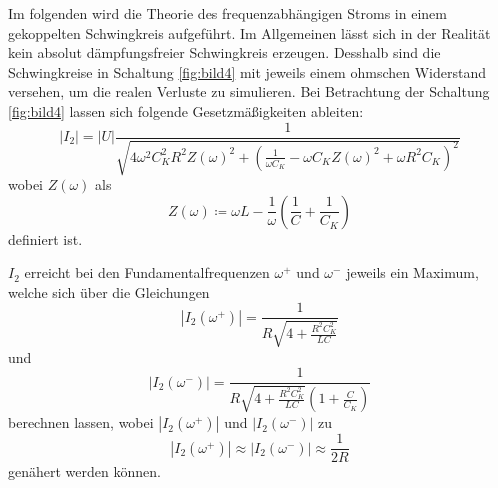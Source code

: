 Im folgenden wird die Theorie des frequenzabhängigen Stroms in einem gekoppelten Schwingkreis aufgeführt.
Im Allgemeinen lässt sich in der Realität kein absolut dämpfungsfreier Schwingkreis erzeugen. Desshalb sind die Schwingkreise in Schaltung \ref{fig:bild4}
mit jeweils einem ohmschen Widerstand versehen, um die realen Verluste zu simulieren. Bei Betrachtung der Schaltung \ref{fig:bild4} lassen sich folgende 
Gesetzmäßigkeiten ableiten:
\begin{equation}
    \left|I_2\right|=\left|U\right|\frac{1}{\sqrt{4\omega^2C_K^2R^2Z(\omega)^2+\left(\frac{1}{\omega C_K}-\omega C_KZ(\omega)^2+\omega R^2C_K\right)^2}}
\end{equation}
wobei $Z(\omega)$ als
\begin{equation}
    Z(\omega)\coloneq \omega L-\frac{1}{\omega}\left(\frac{1}{C}+\frac{1}{C_K}\right)
\end{equation}
definiert ist.

$I_2$ erreicht bei den Fundamentalfrequenzen $\omega^+$ und $\omega^-$ jeweils ein Maximum, welche sich über die Gleichungen
\begin{equation}
    \left|I_2(\omega^+)\right|=\frac{1}{R\sqrt{4+\frac{R^2C_K^2}{LC}}}
\end{equation}
und 
\begin{equation}
    \left|I_2(\omega^-)\right|=\frac{1}{R\sqrt{4+\frac{R^2C_K^2}{LC}}\left(1+\frac{C}{C_K}\right)}
\end{equation}
berechnen lassen, wobei  $\left|I_2(\omega^+)\right|$ und $\left|I_2(\omega^-)\right|$ zu
\begin{equation}
    \left|I_2(\omega^+)\right|\approx\left|I_2(\omega^-)\right|\approx \frac{1}{2R}
\end{equation}
genähert werden können.



